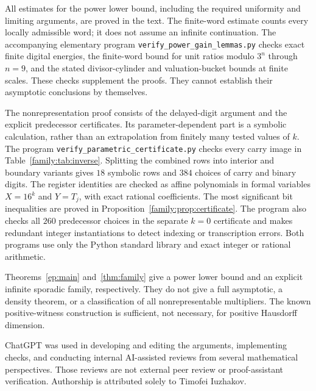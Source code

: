 \documentclass[11pt]{article}
\theoremstyle{remark}
\begin{document}
All estimates for the power lower bound, including the required
uniformity and limiting arguments, are proved in the text. The
finite-word estimate counts every locally admissible word; it does
not assume an infinite continuation. The accompanying elementary
program \texttt{verify\_power\_gain\_lemmas.py} checks exact finite
digital energies, the finite-word bound for unit ratios modulo $3^n$
through $n=9$, and the stated divisor-cylinder and valuation-bucket
bounds at finite scales. These checks supplement the proofs. They
cannot establish their asymptotic conclusions by themselves.

The nonrepresentation proof consists of the delayed-digit argument
and the explicit predecessor certificates. Its parameter-dependent
part is a symbolic calculation, rather than an extrapolation from
finitely many tested values of $k$. The program
\texttt{verify\_\allowbreak{}parametric\_\allowbreak{}certificate.py}
checks every carry image in
Table~\ref{family:tab:inverse}. Splitting the combined rows into
interior and boundary variants gives $18$ symbolic rows and $384$
choices of carry and binary digits. The register identities are checked
as affine polynomials in formal variables $X=16^k$ and $Y=T_j$, with
exact rational coefficients. The most significant bit inequalities
are proved in Proposition~\ref{family:prop:certificate}. The program
also checks all $260$ predecessor choices in the separate $k=0$
certificate and makes redundant integer instantiations to detect
indexing or transcription errors. Both programs use only the Python
standard library and exact integer or rational arithmetic.

Theorems~\ref{ep:main} and~\ref{thm:family} give a power lower bound
and an explicit infinite sporadic family, respectively. They do not
give a full asymptotic, a density theorem, or a classification of all
nonrepresentable multipliers. The known positive-witness construction
is sufficient, not necessary, for positive Hausdorff dimension.

ChatGPT was used in developing and editing the arguments, implementing
checks, and conducting internal AI-assisted reviews from several
mathematical perspectives. Those reviews are not external peer review
or proof-assistant verification. Authorship is attributed solely to
Timofei Iuzhakov.
\end{document}
